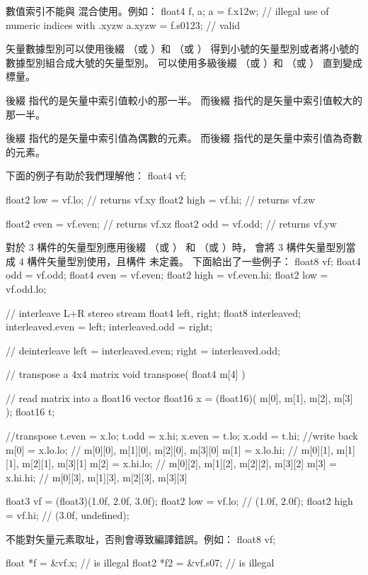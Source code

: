 數值索引不能與  混合使用。例如：
\startclc
float4 f, a;
a = f.x12w;	// illegal use of numeric indices with .xyzw
a.xyzw = f.s0123;	// valid
\stopclc

矢量數據型別可以使用後綴  （或 ）和  （或 ）
得到小號的矢量型別或者將小號的數據型別組合成大號的矢量型別。
可以使用多級後綴  （或 ）和  （或 ）
直到變成標量。

後綴  指代的是矢量中索引值較小的那一半。
而後綴  指代的是矢量中索引值較大的那一半。

後綴  指代的是矢量中索引值為偶數的元素。
而後綴  指代的是矢量中索引值為奇數的元素。

下面的例子有助於我們理解他：
\startclc
float4 vf;

float2 low = vf.lo;	// returns vf.xy
float2 high = vf.hi;	// returns vf.zw

float2 even = vf.even;	// returns vf.xz
float2 odd = vf.odd;	// returns vf.yw
\stopclc

對於 3 構件的矢量型別應用後綴  （或 ）
和  （或 ）時，
會將 3 構件矢量型別當成 4 構件矢量型別使用，且構件  未定義。
下面給出了一些例子：
\startclc
float8	vf;
float4	odd = vf.odd;
float4	even = vf.even;
float2	high = vf.even.hi;
float2	low = vf.odd.lo;

// interleave L+R stereo stream
float4	left, right;
float8	interleaved;
interleaved.even = left;
interleaved.odd = right;

// deinterleave
left = interleaved.even;
right = interleaved.odd;

// transpose a 4x4 matrix
void transpose( float4 m[4] )
{
	// read matrix into a float16 vector
	float16 x = (float16)( m[0], m[1], m[2], m[3] );
	float16 t;

	//transpose
	t.even = x.lo;
	t.odd = x.hi;
	x.even = t.lo;
	x.odd = t.hi;
	//write back
	m[0] = x.lo.lo;	// { m[0][0], m[1][0], m[2][0], m[3][0] }
	m[1] = x.lo.hi;	// { m[0][1], m[1][1], m[2][1], m[3][1] }
	m[2] = x.hi.lo;	// { m[0][2], m[1][2], m[2][2], m[3][2] }
	m[3] = x.hi.hi;	// { m[0][3], m[1][3], m[2][3], m[3][3] }
}

float3	vf = (float3)(1.0f, 2.0f, 3.0f);
float2	low = vf.lo; // (1.0f, 2.0f);
float2	high = vf.hi; // (3.0f, undefined);
\stopclc

不能對矢量元素取址，否則會導致編譯錯誤。例如：
\startclc
float8	vf;

float	*f = &vf.x;		// is illegal
float2	*f2 = &vf.s07;		// is illegal

